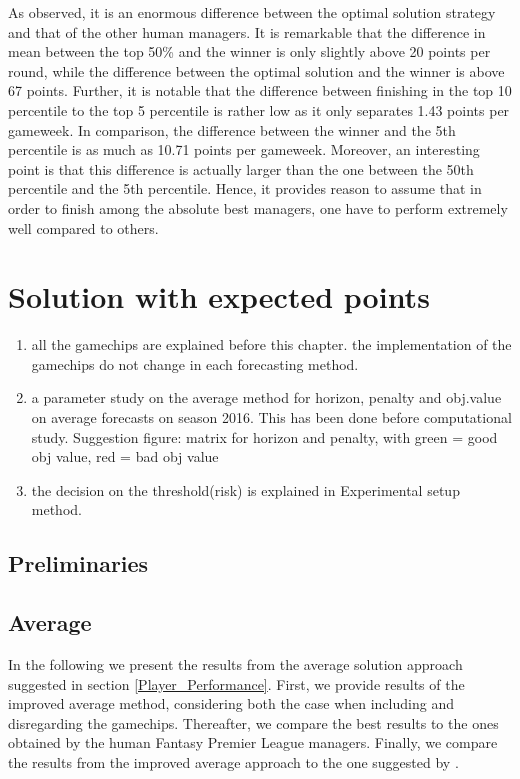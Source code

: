 As observed, it is an enormous difference between the optimal solution strategy and that of the other human managers. It is remarkable that the difference in mean between the top 50\% and the winner is only slightly above 20 points per round, while the difference between the optimal solution and the winner is above 67 points. Further, it is notable that the difference between finishing in the top 10 percentile to the top 5 percentile is rather low as it only separates 1.43 points per gameweek. In comparison, the difference between the winner and the 5th percentile is as much as 10.71 points per gameweek. Moreover, an interesting point is that this difference is actually larger than the one between the 50th percentile and the 5th percentile. Hence, it provides reason to assume that in order to finish among the absolute best managers, one have to perform extremely well compared to others. 
\newpar
 


\section{Solution with expected points}\label{sec:inexact}
\begin{enumerate}
    \item all the gamechips are explained before this chapter. the implementation of the gamechips do not change in each forecasting method. 
    \item a parameter study on the average method for horizon, penalty and obj.value on average forecasts on season 2016. This has been done before computational study. Suggestion figure: matrix for horizon and penalty, with green = good obj value, red = bad obj value
    \item  the decision on the threshold(risk) is explained in Experimental setup method. 
\end{enumerate}

\subsection{Preliminaries}

\subsection{Average} \label{Average_results}
In the following we present the results from the average solution approach suggested in section \ref{Player_Performance}. First, we provide results of the improved average method, considering both the case when including and disregarding the gamechips. Thereafter, we compare the best results to the ones obtained by the human Fantasy Premier League managers. Finally, we compare the results from the improved average approach to the one suggested by \cite{Bonomo}.

